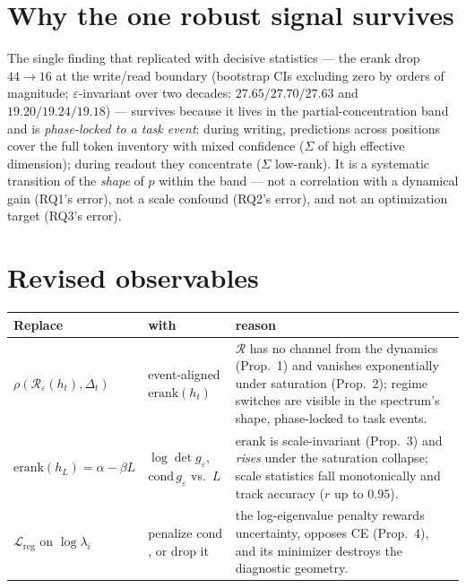 \documentclass[11pt,a4paper]{article}
\theoremstyle{definition}
\theoremstyle{remark}
\begin{document}
\section{Why the one robust signal survives}

The single finding that replicated with decisive statistics --- the erank drop $44 \to 16$ at the
write/read boundary (bootstrap CIs excluding zero by orders of magnitude; $\varepsilon$-invariant
over two decades: $27.65/27.70/27.63$ and $19.20/19.24/19.18$) --- survives because it lives in the
partial-concentration band and is \emph{phase-locked to a task event}: during writing, predictions
across positions cover the full token inventory with mixed confidence ($\Sigma$ of high effective
dimension); during readout they concentrate ($\Sigma$ low-rank). It is a systematic transition of
the \emph{shape} of $p$ within the band --- not a correlation with a dynamical gain (RQ1's error),
not a scale confound (RQ2's error), and not an optimization target (RQ3's error).

\section{Revised observables}

\begin{center}
\begin{tabular}{@{}llp{6.9cm}@{}}
\toprule
\textbf{Replace} & \textbf{with} & \textbf{reason} \\
\midrule
$\rho(\mathcal{R}_\varepsilon(h_t), \Delta_t)$ &
event-aligned $\mathrm{erank}(h_t)$ &
$\mathcal{R}$ has no channel from the dynamics (Prop.\ 1) and vanishes exponentially under
saturation (Prop.\ 2); regime switches are visible in the spectrum's shape, phase-locked to task
events. \\
$\mathrm{erank}(h_L) = \alpha - \beta L$ &
$\log\det g_\varepsilon$, $\mathrm{cond}\,g_\varepsilon$ vs.\ $L$ &
$\mathrm{erank}$ is scale-invariant (Prop.\ 3) and \emph{rises} under the saturation collapse;
scale statistics fall monotonically and track accuracy ($r$ up to $0.95$). \\
$\mathcal{L}_{\mathrm{reg}}$ on $\log \lambda_i$ &
penalize $\mathrm{cond}$, or drop it &
the log-eigenvalue penalty rewards uncertainty, opposes CE (Prop.\ 4), and its minimizer destroys
the diagnostic geometry. \\
\bottomrule
\end{tabular}
\end{center}
\end{document}

